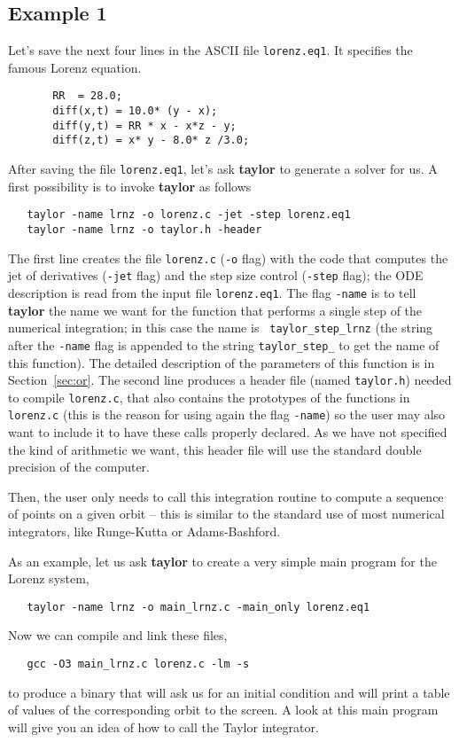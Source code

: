 \documentclass{article}
\begin{document}
\subsection{Example 1}
Let's save the next four lines in the ASCII file \verb+lorenz.eq1+.
It specifies the famous Lorenz equation.

\begin{verbatim}
       RR  = 28.0;
       diff(x,t) = 10.0* (y - x);
       diff(y,t) = RR * x - x*z - y;
       diff(z,t) = x* y - 8.0* z /3.0;
\end{verbatim}

\noindent
After saving the file \verb+lorenz.eq1+, let's
ask {\bf taylor} to generate a solver for us. A first possibility is
to invoke {\bf taylor} as follows
\begin{verbatim}
   taylor -name lrnz -o lorenz.c -jet -step lorenz.eq1
   taylor -name lrnz -o taylor.h -header
\end{verbatim}
The first line creates the file {\tt lorenz.c} ({\tt -o} flag) with
the code that computes the jet of derivatives ({\tt -jet} flag) and
the step size control ({\tt -step} flag); the ODE description is read
from the input file {\tt lorenz.eq1}. The flag {\tt -name} is to tell
{\bf taylor} the name we want for the function that performs a single
step of the numerical integration; in this case the name is {\tt
taylor\_step\_lrnz} (the string after the {\tt -name} flag is appended
to the string {\tt taylor\_step\_} to get the name of this
function). The detailed description of the parameters of this function
is in Section~\ref{sec:or}. The second line produces a header file
(named {\tt taylor.h}) needed to compile {\tt lorenz.c}, that also
contains the prototypes of the functions in {\tt lorenz.c} (this is
the reason for using again the flag {\tt -name}) so the user may also
want to include it to have these calls properly declared. As we have
not specified the kind of arithmetic we want, this header file will
use the standard double precision of the computer.

Then, the user only needs to call this integration routine to compute
a sequence of points on a given orbit -- this is similar to the
standard use of most numerical integrators, like Runge-Kutta or
Adams-Bashford.

As an example, let us ask {\bf taylor} to create a very simple main
program for the Lorenz system,
\begin{verbatim}
   taylor -name lrnz -o main_lrnz.c -main_only lorenz.eq1
\end{verbatim}
Now we can compile and link these files,
\begin{verbatim}
   gcc -O3 main_lrnz.c lorenz.c -lm -s
\end{verbatim}
to produce a binary that will ask us for an initial condition and will
print a table of values of the corresponding orbit to the screen. A
look at this main program will give you an idea of how to call the
Taylor integrator.
\end{document}
